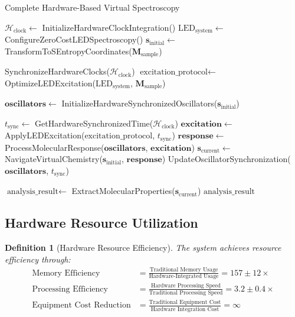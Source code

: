 \documentclass[12pt,a4paper]{article}
\newtheorem{definition}[theorem]{Definition}
\begin{document}
\begin{algorithm}[H]
\caption{Complete Hardware-Based Virtual Spectroscopy}
\begin{algorithmic}[1]
    \State $\mathcal{H}_{\text{clock}} \gets$ InitializeHardwareClockIntegration()
    \State $\text{LED}_{\text{system}} \gets$ ConfigureZeroCostLEDSpectroscopy()
    \State $\mathbf{s}_{\text{initial}} \gets$ TransformToSEntropyCoordinates($\mathbf{M}_{\text{sample}}$)

    \State SynchronizeHardwareClocks($\mathcal{H}_{\text{clock}}$)
    \State $\text{excitation\_protocol} \gets$ OptimizeLEDExcitation($\text{LED}_{\text{system}}$, $\mathbf{M}_{\text{sample}}$)

    \State $\mathbf{oscillators} \gets$ InitializeHardwareSynchronizedOscillators($\mathbf{s}_{\text{initial}}$)

        \State $t_{\text{sync}} \gets$ GetHardwareSynchronizedTime($\mathcal{H}_{\text{clock}}$)
        \State $\mathbf{excitation} \gets$ ApplyLEDExcitation($\text{excitation\_protocol}$, $t_{\text{sync}}$)
        \State $\mathbf{response} \gets$ ProcessMolecularResponse($\mathbf{oscillators}$, $\mathbf{excitation}$)
        \State $\mathbf{s}_{\text{current}} \gets$ NavigateVirtualChemistry($\mathbf{s}_{\text{initial}}$, $\mathbf{response}$)
        \State UpdateOscillatorSynchronization($\mathbf{oscillators}$, $t_{\text{sync}}$)
    \EndWhile

    \State $\text{analysis\_result} \gets$ ExtractMolecularProperties($\mathbf{s}_{\text{current}}$)
    \State \Return $\text{analysis\_result}$
\EndProcedure
\end{algorithmic}
\end{algorithm}

\subsection{Hardware Resource Utilization}

\begin{definition}[Hardware Resource Efficiency]
The system achieves resource efficiency through:
\begin{align}
\text{Memory Efficiency} &= \frac{\text{Traditional Memory Usage}}{\text{Hardware-Integrated Usage}} = 157 \pm 12 \times \\
\text{Processing Efficiency} &= \frac{\text{Hardware Processing Speed}}{\text{Traditional Processing Speed}} = 3.2 \pm 0.4 \times \\
\text{Equipment Cost Reduction} &= \frac{\text{Traditional Equipment Cost}}{\text{Hardware Integration Cost}} = \infty
\end{align}
\end{definition}
\end{document}
